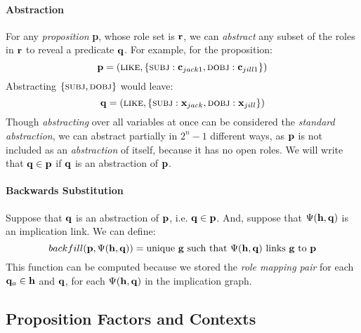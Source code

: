 \documentclass[11pt]{article}
\newcommand{\constant}[1]{{\bf c}_{#1}}
\newcommand{\xvariable}{{\bf x}}
\newcommand{\rvariable}{{\bf r}}
\newcommand{\pvariable}{{\bf p}}
\newcommand{\qvariable}{{\bf q}}
\newcommand{\gvariable}{{\bf g}}
\newcommand{\hvariable}{{\bf h}}
\newcommand{\xjack}{\xvariable_{jack}}
\newcommand{\xjill}{\xvariable_{jill}}
\begin{document}
\paragraph{Abstraction}
For any {\em proposition} \pvariable, whose role set is $\rvariable$, we can {\em abstract} any subset of the roles in $\rvariable$ to reveal a predicate $\qvariable$.
For example, for the proposition:
\begin{equation} \pvariable = (\textsc{like}, \left\{\textsc{subj}: \constant{jack1}, \textsc{dobj}: \constant{jill1} \right\})\end{equation}
Abstracting $\left\{\textsc{subj}, \textsc{dobj}\right\}$ would leave:
\begin{equation}
    \qvariable = (\textsc{like}, \left\{\textsc{subj}: \xjack, \textsc{dobj}: \xjill \right\})
    \label{eq:}
\end{equation}
Though {\em abstracting} over all variables at once can be considered the {\em standard abstraction}, we can abstract partially
in $2^n - 1$ different ways, as $\pvariable$ is not included as an {\em abstraction} of itself, because it has no open roles.
We will write that $\qvariable \in \pvariable$ if $\qvariable$ is an abstraction of $\pvariable$.

\paragraph{Backwards Substitution}
Suppose that $\qvariable$ is an abstraction of $\pvariable$, i.e. $\qvariable \in \pvariable$.
And, suppose that $\Psi(\hvariable, \qvariable)$ is an implication link.
We can define:
\begin{equation}
    backfill(\pvariable, \Psi(\hvariable, \qvariable)) = \text{unique }\gvariable\text{ such that }\Psi(\hvariable, \qvariable)\text{ links $\gvariable$ to } \pvariable
\end{equation}
This function can be computed because we stored the {\em role mapping pair} for each $\qvariable_a \in \hvariable$ and $\qvariable$, for each $\Psi(\hvariable, \qvariable)$ in the implication graph.

\subsection{Proposition Factors and Contexts}
\end{document}
